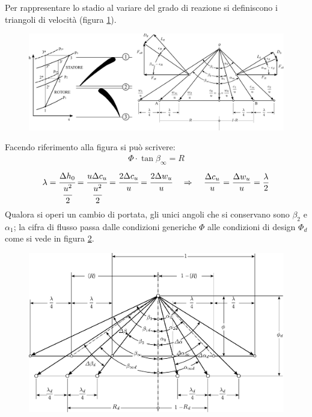 Per rappresentare lo stadio al variare del grado di reazione si definiscono i triangoli di velocità (figura \ref{fig:StadioRipetuto}).
\begin{figure}
\centering
  \includegraphics[width=\textwidth]{fig/StadioRipetuto.pdf}
\caption{}
\label{fig:StadioRipetuto}
\end{figure}
Facendo riferimento alla figura si può scrivere:
\begin{align*}
\Phi \cdot \tan \beta_{\infty} = R
\end{align*}
\begin{equation}\label{eq:lambda}
\lambda = \cfrac{\Delta h_0}{\cfrac{u^2}{2}} = \cfrac{u \Delta c_u}{\cfrac{u^2}{2}} = \cfrac{2 \Delta c_u}{u} = \cfrac{2 \Delta w_u}{u} \;\;\;\; \Rightarrow \;\;\;\; \frac{\Delta c_u}{u} = \frac{\Delta w_u}{u} = \frac{\lambda}{2}
\end{equation}
Qualora si operi un cambio di portata, gli unici angoli che si conservano sono $\beta_2$ e $\alpha_1$; la cifra di flusso passa dalle condizioni generiche $\Phi$ alle condizioni di design $\Phi_d$ come si vede in figura \ref{fig:CondFuoriProg}.
\begin{figure}
\centering
  \includegraphics[width=\textwidth]{fig/CondFuoriProg.pdf}
\caption{}
\label{fig:CondFuoriProg}
\end{figure}

